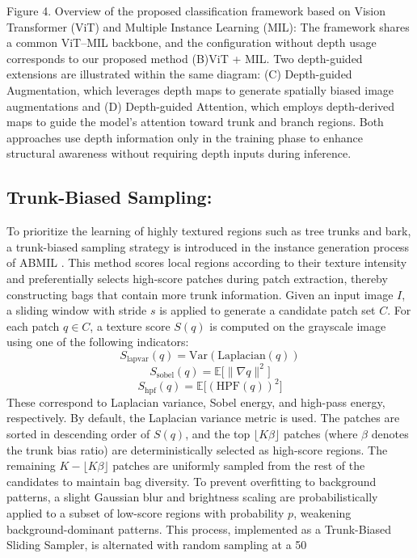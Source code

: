 \documentclass{article}
\begin{document}
Figure 4. Overview of the proposed classification framework based on Vision Transformer (ViT) and Multiple Instance Learning (MIL): The framework shares a common ViT–MIL backbone, and the configuration without depth usage corresponds to our proposed method (B)ViT + MIL. Two depth-guided extensions are illustrated within the same diagram: (C) Depth-guided Augmentation, which leverages depth maps to generate spatially biased image augmentations and (D) Depth-guided Attention, which employs depth-derived maps to guide the model’s attention toward trunk and branch regions. Both approaches use depth information only in the training phase to enhance structural awareness without requiring depth inputs during inference.

\subsection{Trunk-Biased Sampling:}
To prioritize the learning of highly textured regions such as tree trunks and bark, a trunk-biased sampling strategy is introduced in the instance generation process of ABMIL \cite{ref2}. This method scores local regions according to their texture intensity and preferentially selects high-score patches during patch extraction, thereby constructing bags that contain more trunk information.
Given an input image $I$, a sliding window with stride $s$ is applied to generate a candidate patch set $C$. For each patch $q\in C$, a texture score $S(q)$ is computed on the grayscale image using one of the following indicators:
\begin{equation}\tag{7}
S_{\mathrm{lapvar}}(q)=\mathrm{Var}(\mathrm{Laplacian}(q))
\end{equation}
\begin{equation}\tag{8}
S_{\mathrm{sobel}}(q)=\mathbb{E}\big[\|\nabla q\|^2\big]
\end{equation}
\begin{equation}\tag{9}
S_{\mathrm{hpf}}(q)=\mathbb{E}\big[(\mathrm{HPF}(q))^2\big]
\end{equation}
These correspond to Laplacian variance, Sobel energy, and high-pass energy, respectively. By default, the Laplacian variance metric is used. The patches are sorted in descending order of $S(q)$, and the top $\lfloor K\beta\rfloor$ patches (where $\beta$ denotes the trunk bias ratio) are deterministically selected as high-score regions.
The remaining $K-\lfloor K\beta\rfloor$ patches are uniformly sampled from the rest of the candidates to maintain bag diversity.
To prevent overfitting to background patterns, a slight Gaussian blur and brightness scaling are probabilistically applied to a subset of low-score regions with probability $p$, weakening background-dominant patterns. This process, implemented as a Trunk-Biased Sliding Sampler, is alternated with random sampling at a 50%
\end{document}
